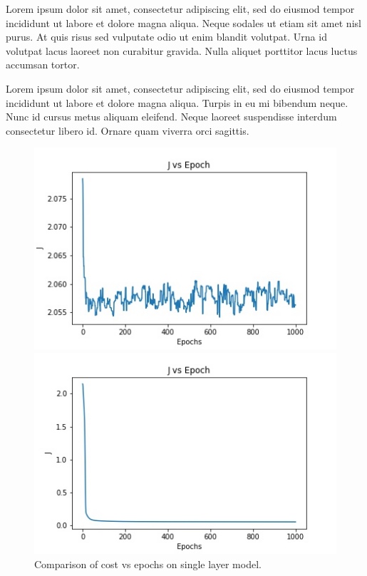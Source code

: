 \documentclass{cup-ino}
\begin{document}
Lorem ipsum dolor sit amet, consectetur adipiscing elit, sed do eiusmod tempor incididunt ut labore et dolore magna aliqua. Neque sodales ut etiam sit amet nisl purus. At quis risus sed vulputate odio ut enim blandit volutpat. Urna id volutpat lacus laoreet non curabitur gravida. Nulla aliquet porttitor lacus luctus accumsan tortor.

Lorem ipsum dolor sit amet, consectetur adipiscing elit, sed do eiusmod tempor incididunt ut labore et dolore magna aliqua. Turpis in eu mi bibendum neque. Nunc id cursus metus aliquam eleifend. Neque laoreet suspendisse interdum consectetur libero id. Ornare quam viverra orci sagittis.

\begin{figure}[h!]
\begin{minipage}{0.47\textwidth}
\includegraphics[width=\linewidth]{images/multi_gen_cost.jpeg}
\end{minipage}
\hfill
\begin{minipage}{0.47\textwidth}
\includegraphics[width=\linewidth]{images/multi_grad_cost.jpeg}
\end{minipage}

\caption{Comparison of cost vs epochs on single layer model.}
\label{fig:multicost}
\end{figure}
\end{document}
